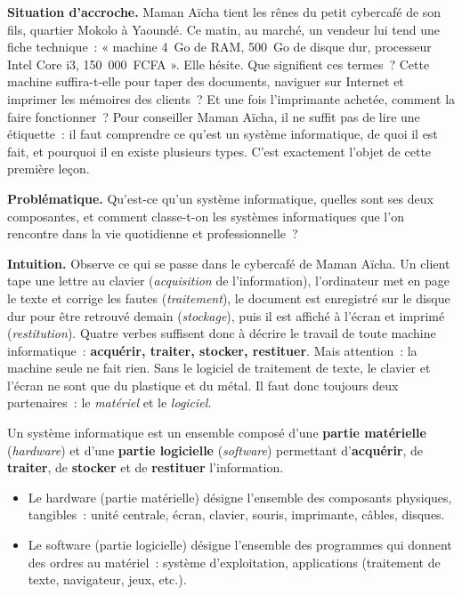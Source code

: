 \documentclass[11pt]{article}
\newcommand{\cle}[1]{{\popxbold\color{popdark}#1}}
\newcounter{popsec}
\newcounter{popsub}
\newcommand{\courssub}[1]{%
  \stepcounter{popsub}%
  \par\vspace{9pt}\noindent{\popxbold\fontsize{11.5}{13}\selectfont\color{popink}{\color{poporange}\thepopsec.\thepopsub}\hspace{6pt}#1}\par\nopagebreak\vspace{4pt}
}
\begin{document}
\textbf{Situation d'accroche.} Maman Aïcha tient les rênes du petit cybercafé de son fils, quartier Mokolo à Yaoundé. Ce matin, au marché, un vendeur lui tend une fiche technique~: « machine 4~Go de RAM, 500~Go de disque dur, processeur Intel Core i3, 150~000~FCFA ». Elle hésite. Que signifient ces termes~? Cette machine suffira-t-elle pour taper des documents, naviguer sur Internet et imprimer les mémoires des clients~? Et une fois l'imprimante achetée, comment la faire fonctionner~? Pour conseiller Maman Aïcha, il ne suffit pas de lire une étiquette~: il faut comprendre ce qu'est un \cle{système informatique}, de quoi il est fait, et pourquoi il en existe plusieurs types. C'est exactement l'objet de cette première leçon.

\textbf{Problématique.} Qu'est-ce qu'un système informatique, quelles sont ses deux composantes, et comment classe-t-on les systèmes informatiques que l'on rencontre dans la vie quotidienne et professionnelle~?

\courssub{Qu'est-ce qu'un système informatique~?}

\textbf{Intuition.} Observe ce qui se passe dans le cybercafé de Maman Aïcha. Un client tape une lettre au clavier (\emph{acquisition} de l'information), l'ordinateur met en page le texte et corrige les fautes (\emph{traitement}), le document est enregistré sur le disque dur pour être retrouvé demain (\emph{stockage}), puis il est affiché à l'écran et imprimé (\emph{restitution}). Quatre verbes suffisent donc à décrire le travail de toute machine informatique~: \textbf{acquérir, traiter, stocker, restituer}. Mais attention~: la machine seule ne fait rien. Sans le logiciel de traitement de texte, le clavier et l'écran ne sont que du plastique et du métal. Il faut donc toujours deux partenaires~: le \emph{matériel} et le \emph{logiciel}.

\begin{definition}
Un \cle{système informatique} est un ensemble composé d'une \textbf{partie matérielle} (\emph{hardware}) et d'une \textbf{partie logicielle} (\emph{software}) permettant d'\textbf{acquérir}, de \textbf{traiter}, de \textbf{stocker} et de \textbf{restituer} l'information.
\begin{itemize}
  \item Le \cle{hardware} (partie matérielle) désigne l'ensemble des composants physiques, tangibles~: unité centrale, écran, clavier, souris, imprimante, câbles, disques.
  \item Le \cle{software} (partie logicielle) désigne l'ensemble des programmes qui donnent des ordres au matériel~: système d'exploitation, applications (traitement de texte, navigateur, jeux, etc.).
\end{itemize}
\end{definition}
\end{document}

